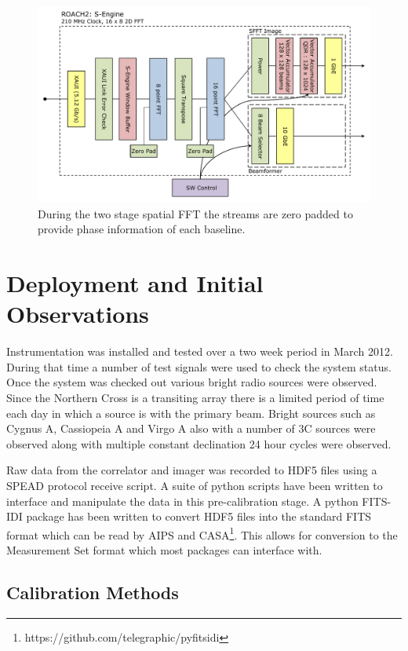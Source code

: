 \documentclass[useAMS,macros,usenatbib,onecolumn]{mn2e}
\begin{document}
\begin{figure}
    \centering
    \includegraphics[scale=0.6]{graphics/crop_sengine_block.pdf}
    \caption{During the two stage spatial FFT the streams are zero padded to provide phase information of each baseline.}
    \label{fig:seng_block}
\end{figure}

\section{Deployment and Initial Observations}
\label{observations}

Instrumentation was installed and tested over a two week period in March 2012.
During that time a number of test signals were used to check the system status.
Once the system was checked out various bright radio sources were observed.
Since the Northern Cross is a transiting array there is a limited period of time each day in which a source is with the primary beam.
Bright sources such as Cygnus A, Cassiopeia A and Virgo A also with a number of 3C sources were observed along with multiple constant declination 24 hour cycles were observed.

Raw data from the correlator and imager was recorded to HDF5 files using a SPEAD protocol receive script.
A suite of python scripts have been written to interface and manipulate the data in this pre-calibration stage.
A python FITS-IDI package has been written to convert HDF5 files into the standard FITS format which can be read by AIPS and CASA\footnote{https://github.com/telegraphic/pyfitsidi}.
This allows for conversion to the Measurement Set format which most packages can interface with.

\subsection{Calibration Methods}
\label{calibration}
\end{document}
